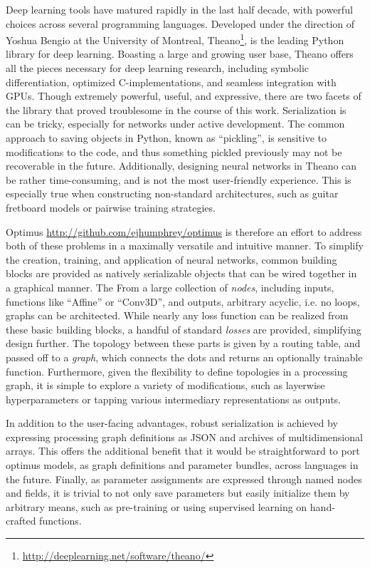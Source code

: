 Deep learning tools have matured rapidly in the last half decade, with powerful choices across several programming languages.
Developed under the direction of Yoshua Bengio at the University of Montreal, Theano\footnote{\url{http://deeplearning.net/software/theano/}}, is the leading Python library for deep learning.
Boasting a large and growing user base, Theano offers all the pieces necessary for deep learning research, including symbolic differentiation, optimized C-implementations, and seamless integration with GPUs.
Though extremely powerful, useful, and expressive, there are two facets of the library that proved troublesome in the course of this work.
Serialization is can be tricky, especially for networks under active development.
The common approach to saving objects in Python, known as ``pickling'', is sensitive to modifications to the code, and thus something pickled previously may not be recoverable in the future.
Additionally, designing neural networks in Theano can be rather time-consuming, and is not the most user-friendly experience.
This is especially true when constructing non-standard architectures, such as guitar fretboard models or pairwise training strategies.

Optimus \url{http://github.com/ejhumphrey/optimus} is therefore an effort to address both of these problems in a maximally versatile and intuitive manner.
To simplify the creation, training, and application of neural networks, common building blocks are provided as natively serializable objects that can be wired together in a graphical manner.
The
From a large collection of \emph{nodes}, including inputs, functions like ``Affine'' or ``Conv3D'', and outputs, arbitrary acyclic, i.e. no loops, graphs can be architected.
While nearly any loss function can be realized from these basic building blocks, a handful of standard \emph{losses} are provided, simplifying design further.
The topology between these parts is given by a routing table, and passed off to a \emph{graph}, which connects the dots and returns an optionally trainable function.
Furthermore, given the flexibility to define topologies in a processing graph, it is simple to explore a variety of modifications, such as layerwise hyperparameters or tapping various intermediary representations as outputs.

In addition to the user-facing advantages, robust serialization is achieved by expressing processing graph definitions as JSON and archives of multidimensional arrays.
This offers the additional benefit that it would be straightforward to port optimus models, as graph definitions and parameter bundles, across languages in the future.
Finally, as parameter assignments are expressed through named nodes and fields, it is trivial to not only save parameters but easily initialize them by arbitrary means, such as pre-training or using supervised learning on hand-crafted functions.


